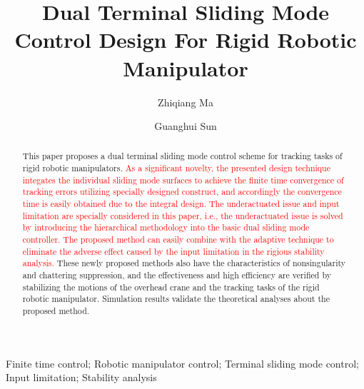 \documentclass[3p]{elsarticle}
\theoremstyle{plain}
\theoremstyle{remark}
\begin{document}
\begin{frontmatter}
\title{Dual Terminal Sliding Mode Control Design For Rigid Robotic Manipulator}
\author{Zhiqiang Ma}
\author{Guanghui Sun}
\address{Research Institute of Intelligent Control and Systems, Harbin Institute of Technology, Harbin 150001, China}

\begin{abstract}
This paper proposes a dual terminal sliding mode control scheme for tracking tasks of rigid robotic manipulators. \textcolor{red}{As a signiﬁcant novelty, the presented design technique integates the individual sliding mode  surfaces to achieve the finite time convergence of tracking errors utilizing specially designed construct, and accordingly the convergence time is easily obtained due to the integral design. The underactuated issue and input limitation are specially considered in this paper, i.e., the underactuated issue is solved by introducing the hierarchical methodology into the basic dual sliding mode controller. The proposed method can easily combine with the adaptive technique to  eliminate the adverse effect caused by the input limitation in the rigious stability analysis.} These newly proposed methods also have the characteristics of nonsingularity and chattering suppression, and the effectiveness and high efficiency are verified by stabilizing the motions of the overhead crane and the tracking tasks of the rigid robotic manipulator. Simulation results validate the theoretical analyses about the proposed method.
\end{abstract}
\begin{keyword}
Finite time control; Robotic manipulator control; Terminal sliding mode control; Input limitation; Stability analysis
\end{keyword}
\end{frontmatter}
\end{document}
